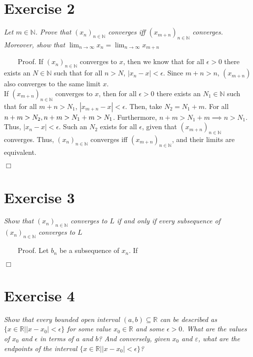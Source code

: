 \documentclass[
]{article}
\begin{document}
\hypertarget{exercise-2}{%
\section{Exercise 2}\label{exercise-2}}

\textit{Let $m \in \mathbb{N}$. Prove that $(x_n)_{n \in \mathbb{N}}$ converges iff $(x_{m+n})_{n \in \mathbb{N}}$ converges. Moreover, show that $\lim_{n\to\infty} x_n = \lim_{n\to\infty} x_{m+n}$}

~~~~Proof. If \((x_n)_{n \in \mathbb{N}}\) converges to \(x\), then we
know that for all \(\epsilon >0\) there exists an \(N \in \mathbb{N}\)
such that for all \(n>N\), \(|x_n - x|<\epsilon\). Since \(m + n > n\),
\((x_{m+n})\) also converges to the same limit \(x\).\\
\hspace*{0.333em}\hspace*{0.333em}\hspace*{0.333em}\hspace*{0.333em}If
\((x_{m+n})_{n \in \mathbb{N}}\) converges to \(x\), then for all
\(\epsilon >0\) there exists an \(N_1 \in \mathbb{N}\) such that for all
\(m + n>N_1\), \(|x_{m+n} - x|<\epsilon\). Then, take \(N_2 = N_1 + m\).
For all \(n + m> N_2, \space n+m > N_1 + m > N_1\). Furthermore,
\(n+m > N_1 + m \implies n > N_1\). Thus, \(|x_{n} - x|<\epsilon\). Such
an \(N_2\) exists for all \(\epsilon\), given that
\((x_{m+n})_{n \in \mathbb{N}}\) converges. Thus,
\((x_n)_{n \in \mathbb{N}}\) converges iff
\((x_{m+n})_{n \in \mathbb{N}}\), and their limits are equivalent.

\hfill \(\Box\)

\hypertarget{exercise-3}{%
\section{Exercise 3}\label{exercise-3}}

\textit{Show that $(x_n)_{n\in \mathbb{N}}$ converges to $L$ if and only if every subsequence of $(x_n)_{n\in \mathbb{N}}$ converges to $L$}

~~~~Proof. Let \(b_n\) be a subsequence of \(x_n\). If

\hfill \(\Box\)

\hypertarget{exercise-4}{%
\section{Exercise 4}\label{exercise-4}}

\emph{Show that every bounded open interval
\((a,b) \subseteq \mathbb{R}\) can be described as
\(\{x\in \mathbb{R}||x−x_0|<\epsilon\}\) for some value
\(x_0 \in \mathbb{R}\) and some \(\epsilon>0\). What are the values of
\(x_0\) and \(\epsilon\) in terms of \(a\) and \(b\)? And conversely,
given \(x_0\) and \(ε\), what are the endpoints of the interval
\(\{x\in \mathbb{R}||x−x_0|<\epsilon\}\)?}
\end{document}
